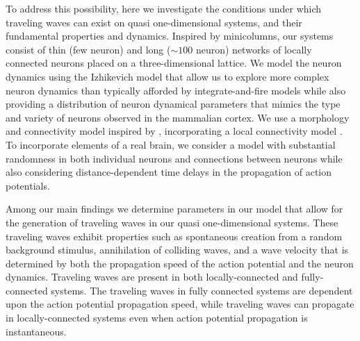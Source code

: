 \documentclass[12pt]{article}
\begin{document}
To address this possibility, here we investigate the conditions under which traveling waves can exist on quasi one-dimensional systems, and their fundamental properties and dynamics.  
Inspired by minicolumns, our systems consist of thin (few neuron) and long ($\sim 100$ neuron) networks of locally connected neurons placed on a three-dimensional lattice.  
We model the neuron dynamics using the Izhikevich model \parencite{izhikevich2003} that allow us to explore more complex neuron dynamics than typically afforded by integrate-and-fire models \parencite{keane2015}\parencite{Senk2020} while also providing a distribution of neuron dynamical parameters that mimics the type and variety of neurons observed in the mammalian cortex.
We use a morphology and connectivity model inspired by \parencite{maass2002}, incorporating a local connectivity model \parencite{Levy2012}\parencite{Pyle2017}\parencite{Fino2011}.
To incorporate elements of a real brain, we consider a model with substantial randomness in both individual neurons and connections between neurons while also considering  distance-dependent time delays in the propagation of action potentials.

Among our main findings we determine parameters in our model that allow for the generation of traveling waves in our quasi one-dimensional systems. 
These traveling waves exhibit properties such as spontaneous creation from a random background stimulus, annihilation of colliding waves, and a wave velocity that is determined by both the propagation speed of the action potential and the neuron dynamics.
Traveling waves are present in both locally-connected and fully-connected systems. 
The traveling waves in fully connected systems are dependent upon the action potential propagation speed, while traveling waves can propagate in locally-connected systems even when action potential propagation is instantaneous.
\end{document}
